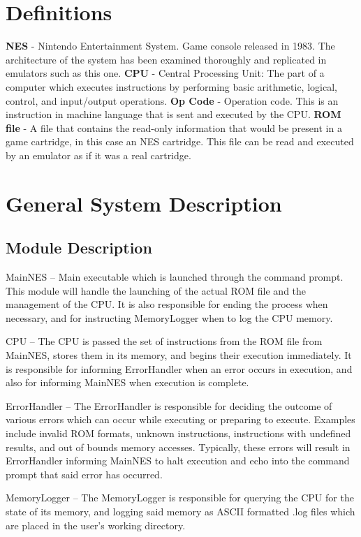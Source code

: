 \documentclass[12pt]{article}
\begin{document}
\section{Definitions}
	\textbf{NES} - Nintendo Entertainment System. Game console released in 1983. The architecture of the system has been examined thoroughly and replicated in emulators such as this one.
	\textbf{CPU} - Central Processing Unit: The part of a computer which executes instructions by performing basic arithmetic, logical, control, and input/output operations.
	\textbf{Op Code} - Operation code. This is an instruction in machine language that is sent and executed by the CPU.
	\textbf{ROM file} - A file that contains the read-only information that would be present in a game cartridge, in this case an NES cartridge. This file can be read and executed by an emulator as if it was a real cartridge.
\section{General System Description}
	\subsection{Module Description}
		MainNES – Main executable which is launched through the command prompt. This module will handle the launching of the actual ROM file and the management of the CPU. It is also responsible for ending the process when necessary, and for instructing MemoryLogger when to log the CPU memory.

		CPU – The CPU is passed the set of instructions from the ROM file from MainNES, stores them in its memory, and begins their execution immediately. It is responsible for informing ErrorHandler when an error occurs in execution, and also for informing MainNES when execution is complete.

		ErrorHandler – The ErrorHandler is responsible for deciding the outcome of various errors which can occur while executing or preparing to execute. Examples include invalid ROM formats, unknown instructions, instructions with undefined results, and out of bounds memory accesses. Typically, these errors will result in ErrorHandler informing MainNES to halt execution and echo into the command prompt that said error has occurred.

		MemoryLogger – The MemoryLogger is responsible for querying the CPU for the state of its memory, and logging said memory as ASCII formatted .log files which are placed in the user’s working directory.
\end{document}
